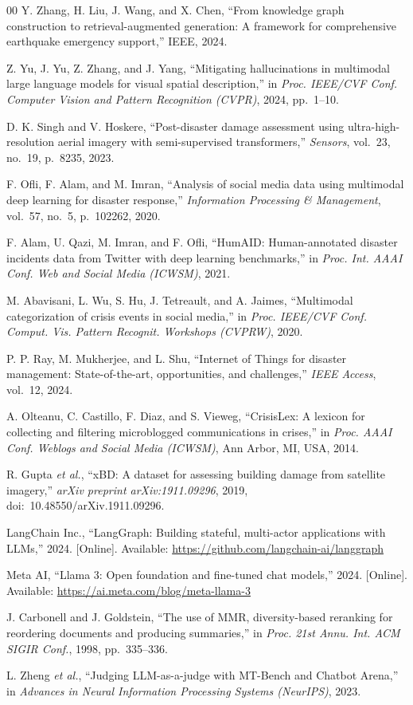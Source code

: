 \documentclass[conference]{IEEEtran}
\begin{document}
\begin{thebibliography}{00}
 Y. Zhang, H. Liu, J. Wang, and X. Chen,
``From knowledge graph construction to retrieval-augmented generation:
A framework for comprehensive earthquake emergency support,'' IEEE, 2024.

 Z. Yu, J. Yu, Z. Zhang, and J. Yang,
``Mitigating hallucinations in multimodal large language models for visual
spatial description,''
in \textit{Proc. IEEE/CVF Conf. Computer Vision and Pattern Recognition
(CVPR)}, 2024, pp.~1--10.

 D. K. Singh and V. Hoskere,
``Post-disaster damage assessment using ultra-high-resolution aerial imagery
with semi-supervised transformers,''
\textit{Sensors}, vol.~23, no.~19, p.~8235, 2023.

 F. Ofli, F. Alam, and M. Imran,
``Analysis of social media data using multimodal deep learning for disaster
response,''
\textit{Information Processing \& Management}, vol.~57, no.~5, p.~102262, 2020.

 F. Alam, U. Qazi, M. Imran, and F. Ofli,
``HumAID: Human-annotated disaster incidents data from Twitter with deep
learning benchmarks,''
in \textit{Proc. Int. AAAI Conf. Web and Social Media (ICWSM)}, 2021.

 M. Abavisani, L. Wu, S. Hu, J. Tetreault, and A. Jaimes,
``Multimodal categorization of crisis events in social media,''
in \textit{Proc. IEEE/CVF Conf. Comput. Vis. Pattern Recognit. Workshops
(CVPRW)}, 2020.

 P. P. Ray, M. Mukherjee, and L. Shu,
``Internet of Things for disaster management: State-of-the-art, opportunities,
and challenges,'' \textit{IEEE Access}, vol.~12, 2024.

 A. Olteanu, C. Castillo, F. Diaz, and S. Vieweg,
``CrisisLex: A lexicon for collecting and filtering microblogged
communications in crises,''
in \textit{Proc. AAAI Conf. Weblogs and Social Media (ICWSM)},
Ann Arbor, MI, USA, 2014.

 R. Gupta \textit{et al.},
``xBD: A dataset for assessing building damage from satellite imagery,''
\textit{arXiv preprint arXiv:1911.09296}, 2019,
doi:~10.48550/arXiv.1911.09296.

 LangChain Inc., ``LangGraph: Building stateful, multi-actor
applications with LLMs,'' 2024. [Online]. Available:
\url{https://github.com/langchain-ai/langgraph}

 Meta AI, ``Llama 3: Open foundation and fine-tuned chat
models,'' 2024. [Online]. Available:
\url{https://ai.meta.com/blog/meta-llama-3}

 J. Carbonell and J. Goldstein,
``The use of MMR, diversity-based reranking for reordering documents and
producing summaries,''
in \textit{Proc. 21st Annu. Int. ACM SIGIR Conf.}, 1998, pp.~335--336.

 L. Zheng \textit{et al.},
``Judging LLM-as-a-judge with MT-Bench and Chatbot Arena,''
in \textit{Advances in Neural Information Processing Systems (NeurIPS)}, 2023.

\end{thebibliography}
\end{document}
